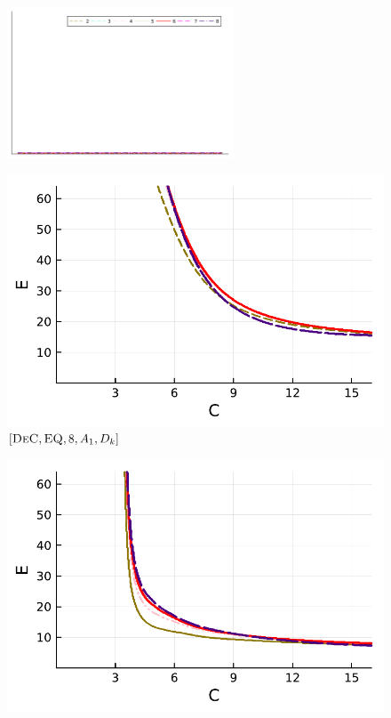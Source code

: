 \begin{figure}[!h]
	\centering
	\includegraphics[width=0.6\textwidth,trim={160 340 30 22}, clip]{pdf/pdepics/legends/colors_a-d_new_horiz_2-8_no_order.pdf}\\
	\begin{minipage}[t]{0.32\textwidth}
		\includegraphics[width=\textwidth]{pdf/pdepics/diff/IMEXDeC_equispaced_diff_ord_2468.pdf}
		\centering
		$[\textsc{DeC},\textsc{EQ}, 8, A_1,D_k]$
	\end{minipage} 
	\begin{minipage}[t]{0.32\textwidth}
		\includegraphics[width=\textwidth]{pdf/pdepics/diff/IMEXDeC_subtimesteps_equispaced_diff_ord_2468.pdf}

\end{minipage}
\end{figure}
